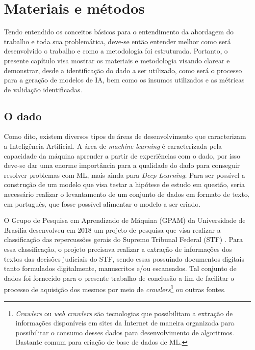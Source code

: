 \chapter[Materiais e métodos]{Materiais e métodos}

Tendo entendido os conceitos básicos para o entendimento da abordagem do trabalho e toda sua problemática, deve-se então entender melhor como será desenvolvido o trabalho e como a metodologia foi estruturada. Portanto, o presente capítulo visa mostrar os materiais e metodologia visando clarear e demonstrar, desde a identificação do dado a ser utilizado, como será o processo para a geração de modelos de IA, bem como os insumos utilizados e as métricas de validação identificadas.

\section{O dado} \label{sec:dataset}

Como dito, existem diversos tipos de áreas de desenvolvimento que caracterizam a Inteligência Artificial. A área de \textit{machine learning} é caracterizada pela capacidade da máquina aprender a partir de experiências com o dado, por isso deve-se dar uma enorme importância para a qualidade do dado para conseguir resolver problemas com ML, mais ainda para \textit{Deep Learning}. Para ser possível a construção de um modelo que visa testar a hipótese de estudo em questão, seria necessário realizar o levantamento de um conjunto de dados em formato de texto, em português, que fosse possível alimentar o modelo a ser criado.

O Grupo de Pesquisa em Aprendizado de Máquina (GPAM) da Universidade de Brasília desenvolveu em 2018 um projeto de pesquisa que visa realizar a classificação das repercussões gerais do Supremo Tribunal Federal (STF) \cite{cnn-for-STF}. Para essa classificação, o projeto precisava realizar a extração de informações dos textos das decisões judiciais do STF, sendo essas possuindo documentos digitais tanto formulados digitalmente, manuscritos e/ou escaneados. Tal conjunto de dados foi fornecido para o presente trabalho de conclusão a fim de facilitar o processo de aquisição dos mesmos por meio de \textit{crawlers}\footnote{
  \textit{Crawlers} ou \textit{web crawlers} são tecnologias que possibilitam a extração de informações disponíveis em sites da Internet de maneira organizada para possibilitar o consumo desses dados para desenvolvimento de algoritmos. Bastante comum para criação de base de dados de ML.
} ou outras fontes.

